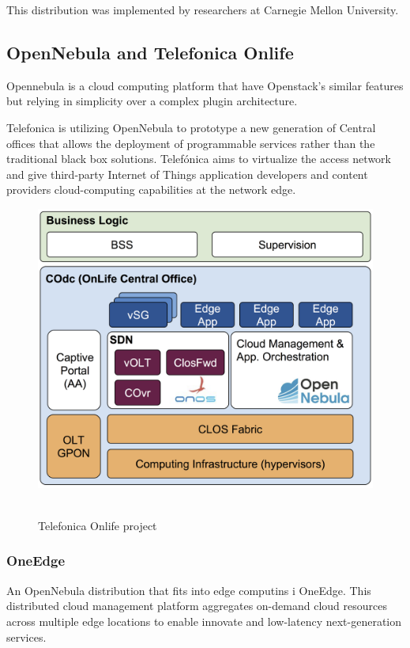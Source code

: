 This distribution was implemented by researchers at Carnegie Mellon University.
\newpage
\subsection{OpenNebula and Telefonica Onlife}
\label{makereference2.3.2}

Opennebula is a cloud computing platform that have Openstack's similar features but relying in simplicity over a complex plugin architecture.

Telefonica is utilizing OpenNebula to prototype a new generation of Central offices that allows the deployment of programmable services rather than the traditional black box solutions. Telefónica aims to virtualize the access network and give third-party Internet of Things application developers and content providers cloud-computing capabilities at the network edge.~\cite{IEC:Opennebula:2017}

\begin{figure}[h]%
    \includegraphics[width=6.5in]{figures/opennebula_edge.png}
~\caption{Telefonica Onlife project}
\label{figure2.3}
\end{figure}

\newpage
\subsubsection{OneEdge}

An OpenNebula distribution that fits into edge computins i OneEdge. This distributed cloud management platform aggregates on-demand cloud resources across multiple edge locations to enable innovate and low-latency next-generation services. ~\cite{onedge}

